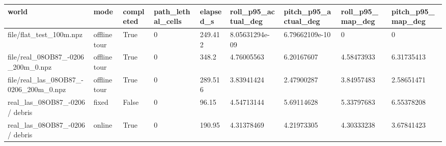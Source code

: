 \begin{tabular}{lllllllll}
\hline
world & mode & completed & path\_lethal\_cells & elapsed\_s & roll\_p95\_actual\_deg & pitch\_p95\_actual\_deg & roll\_p95\_map\_deg & pitch\_p95\_map\_deg \\
\hline
file/flat\_test\_100m.npz & offline tour & True & 0 & 249.412 & 8.05631294e-09 & 6.79662109e-10 & 0 & 0 \\
file/real\_08OB87\_-0206\_200m\_0.npz & offline tour & True & 0 & 348.2 & 4.76005563 & 6.20167607 & 4.58473933 & 6.31735413 \\
file/real\_las\_08OB87\_-0206\_200m\_0.npz & offline tour & True & 0 & 289.516 & 3.83941424 & 2.47900287 & 3.84957483 & 2.58651471 \\
real\_las\_08OB87\_-0206 / debris & fixed & False & 0 & 96.15 & 4.54713144 & 5.69114628 & 5.33797683 & 6.55378208 \\
real\_las\_08OB87\_-0206 / debris & online & True & 0 & 190.95 & 4.31378469 & 4.21973305 & 4.30333238 & 3.67841423 \\
\hline
\end{tabular}
